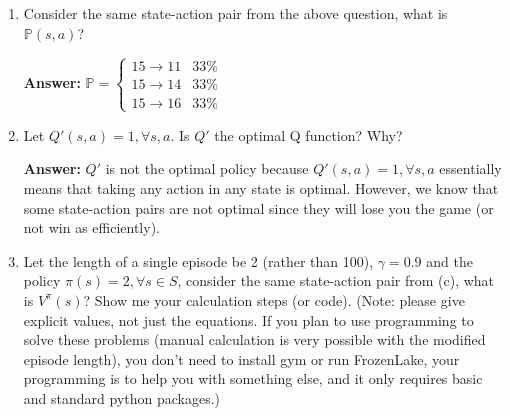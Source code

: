 \documentclass{assignment}
\begin{document}
\begin{problem}
\begin{enumerate}
\begin{enumerate}[label=(\alph*)]

    
        \item Consider the same state-action pair from the above question, what is $\mathbb{P}(s, a)$?

        \color{blue}\textbf{Answer:} 
            $\mathbb{P} = \begin{cases}
                15 \rightarrow 11 & 33\% \\
                15 \rightarrow 14 & 33\% \\
                15 \rightarrow 16 & 33\%
            \end{cases}$
        \color{black}


    
        \item Let $Q'(s, a) = 1, \forall s, a.$ Is $Q'$ the optimal Q function? Why?

        \color{blue}\textbf{Answer:} 
            $Q'$ is not the optimal policy because $Q'(s, a) = 1, \forall s, a$ essentially means that taking any action in any state is optimal. However, we know that some state-action pairs are not optimal since they will lose you the game (or not win as efficiently).
        \color{black}


    
        \item Let the length of a single episode be 2 (rather than 100), $\gamma = 0.9$ and the policy $\pi(s) = 2, \forall s \in S$, consider the same state-action pair from (c), what is $V^{\pi}(s)$? Show me your calculation steps (or code). (Note: please give explicit values, not just the equations. If you plan to use programming to solve these problems (manual calculation is very possible with the modified episode length), you don’t need to install gym or run FrozenLake, your programming is to help you with something else, and it only requires basic and standard python packages.)


\end{enumerate}
\end{enumerate}
\end{problem}
\end{document}
